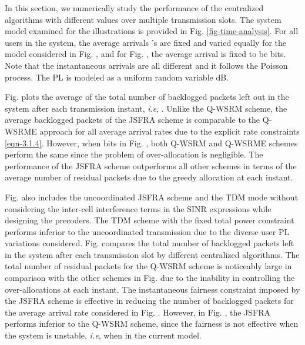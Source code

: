 In this section, we numerically study the performance of the centralized algorithms with different  values over multiple transmission slots. The system model examined for the illustrations is provided in Fig. \ref{fig-time-analysis}. For all users in the system, the average arrivals 's are fixed and varied equally for the model considered in Fig. , and for Fig. , the average arrival is fixed to be  bits. Note that the instantaneous arrivals  are all different and it follows the Poisson process. The \ac{PL} is modeled as a uniform random variable \me{[0,-6]} dB.

Fig.  plots the average of the total number of backlogged packets left out in the system after each transmission instant, \textit{i.e}, . Unlike the \ac{Q-WSRM} scheme, the average backlogged packets of the  \ac{JSFRA} scheme is comparable to the \ac{Q-WSRME} approach for all average arrival rates due to the explicit rate constraints \eqref{eqn-3.1.4}. However, when  bits in Fig. , both \ac{Q-WSRM} and \ac{Q-WSRME} schemes perform the same since the problem of over-allocation is negligible. The performance of the  \ac{JSFRA} scheme outperforms all other schemes in terms of the average number of residual packets due to the greedy allocation at each instant. 

Fig.  also includes the uncoordinated  \ac{JSFRA} scheme and the \ac{TDM} mode without considering the inter-cell interference terms in the \ac{SINR} expressions while designing the precoders. The \ac{TDM} scheme with the fixed total power constraint performs inferior to the uncoordinated transmission due to the diverse user \ac{PL} variations considered. Fig.  compares the total number of backlogged packets left in the system after each transmission slot by different centralized algorithms. The total number of residual packets for the \ac{Q-WSRM} scheme is noticeably large in comparison with the other schemes in Fig.  due to the inability in controlling the over-allocations at each instant. The instantaneous fairness constraint imposed by the \me{\ell_\infty} \ac{JSFRA} scheme is effective in reducing the number of backlogged packets for the average arrival rate considered in Fig. . However, in Fig. , the \me{\ell_\infty} \ac{JSFRA} performs inferior to the \ac{Q-WSRM} scheme, since the fairness is not effective when the system is unstable, \textit{i.e}, when  in the current model.

